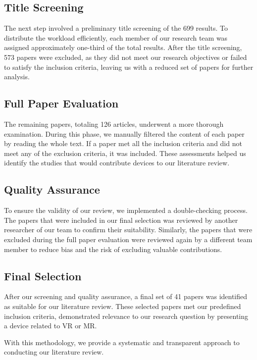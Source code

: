 \subsection{Title Screening}
The next step involved a preliminary title screening of the 699 results. To distribute the workload efficiently, each member of our research team was assigned approximately one-third of the total results. After the title screening, 573 papers were excluded, as they did not meet our research objectives or failed to satisfy the inclusion criteria, leaving us with a reduced set of papers for further analysis.


\subsection{Full Paper Evaluation}
The remaining papers, totaling 126 articles, underwent a more thorough examination. During this phase, we manually filtered the content of each paper by reading the whole text. If a paper met all the inclusion criteria and did not meet any of the exclusion criteria, it was included. These assessments helped us identify the studies that would contribute devices to our literature review.

\subsection{Quality Assurance}
To ensure the validity of our review, we implemented a double-checking process. The papers that were included in our final selection was reviewed by another researcher of our team to confirm their suitability. Similarly, the papers that were excluded during the full paper evaluation were reviewed again by a different team member to reduce bias and the risk of excluding valuable contributions.

\subsection{Final Selection}
After our screening and quality assurance, a final set of 41 papers was identified as suitable for our literature review. These selected papers met our predefined inclusion criteria, demonstrated relevance to our research question by presenting a device related to VR or MR.

With this methodology, we provide a systematic and transparent approach to conducting our literature review.





